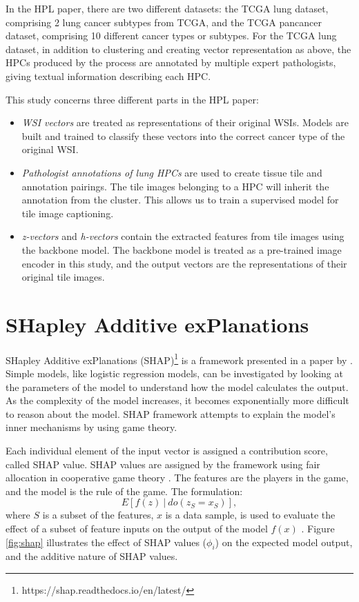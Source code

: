 \documentclass{l4proj}
\begin{document}
In the HPL paper, there are two different datasets: the TCGA lung dataset, comprising 2 lung cancer subtypes from TCGA, and the TCGA pancancer dataset, comprising 10 different cancer types or subtypes. For the TCGA lung dataset, in addition to clustering and creating vector representation as above, the HPCs produced by the process are annotated by multiple expert pathologists, giving textual information describing each HPC. 

This study concerns three different parts in the HPL paper:
\begin{itemize}
    \item \emph{WSI vectors} are treated as representations of their original WSIs. Models are built and trained to classify these vectors into the correct cancer type of the original WSI.
    \item \emph{Pathologist annotations of lung HPCs} are used to create tissue tile and annotation pairings. The tile images belonging to a HPC will inherit the annotation from the cluster. This allows us to train a supervised model for tile image captioning.
    \item \emph{z-vectors} and \emph{h-vectors} contain the extracted features from tile images using the backbone model. The backbone model is treated as a pre-trained image encoder in this study, and the output vectors are the representations of their original tile images.
\end{itemize}

\section{SHapley Additive exPlanations}
SHapley Additive exPlanations (SHAP)\footnote{https://shap.readthedocs.io/en/latest/} is a framework presented in a paper by \cite{lundberg2017}. Simple models, like logistic regression models, can be investigated by looking at the parameters of the model to understand how the model calculates the output. As the complexity of the model increases, it becomes exponentially more difficult to reason about the model. SHAP framework attempts to explain the model's inner mechanisms by using game theory.

Each individual element of the input vector is assigned a contribution score, called SHAP value. SHAP values are assigned by the framework using fair allocation in cooperative game theory \citep{Szymaski2025}. The features are the players in the game, and the model is the rule of the game. The formulation:
\begin{equation}
    E[f(z)\ |\ do(z_S = x_S)],
\end{equation}
where $S$ is a subset of the features, $x$ is a data sample, is used to evaluate the effect of a subset of feature inputs on the output of the model $f(x)$ \citep{ShapDoc}. Figure \ref{fig:shap} illustrates the effect of SHAP values ($\phi_i$) on the expected model output, and the additive nature of SHAP values.
\end{document}
